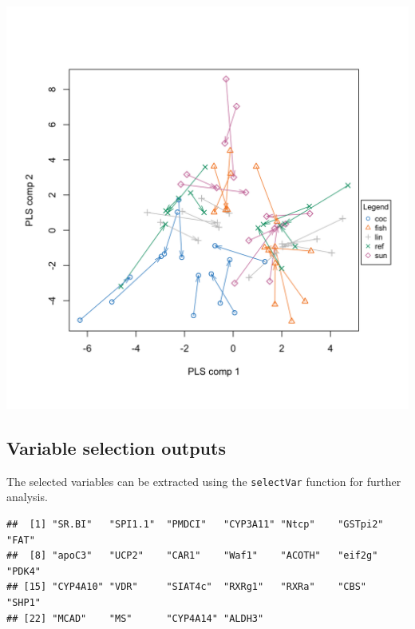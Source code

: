 \documentclass[]{book}
\newenvironment{Shaded}{\begin{snugshade}}{\end{snugshade}}
\newcommand{\CommentTok}[1]{\textcolor[rgb]{0.56,0.35,0.01}{\textit{#1}}}
\newcommand{\DataTypeTok}[1]{\textcolor[rgb]{0.13,0.29,0.53}{#1}}
\newcommand{\DecValTok}[1]{\textcolor[rgb]{0.00,0.00,0.81}{#1}}
\newcommand{\KeywordTok}[1]{\textcolor[rgb]{0.13,0.29,0.53}{\textbf{#1}}}
\newcommand{\NormalTok}[1]{#1}
\newcommand{\OperatorTok}[1]{\textcolor[rgb]{0.81,0.36,0.00}{\textbf{#1}}}
\newcommand{\StringTok}[1]{\textcolor[rgb]{0.31,0.60,0.02}{#1}}
\begin{document}
\begin{center}\includegraphics[width=0.75\linewidth,]{Figures/05-pls-plotArrow-1} \end{center}

\hypertarget{variable-selection-outputs-1}{%
\subsection{Variable selection outputs}\label{variable-selection-outputs-1}}

The selected variables can be extracted using the \texttt{selectVar} function for further analysis.

\begin{Shaded}
\end{Shaded}

\begin{verbatim}
##  [1] "SR.BI"   "SPI1.1"  "PMDCI"   "CYP3A11" "Ntcp"    "GSTpi2"  "FAT"    
##  [8] "apoC3"   "UCP2"    "CAR1"    "Waf1"    "ACOTH"   "eif2g"   "PDK4"   
## [15] "CYP4A10" "VDR"     "SIAT4c"  "RXRg1"   "RXRa"    "CBS"     "SHP1"   
## [22] "MCAD"    "MS"      "CYP4A14" "ALDH3"
\end{verbatim}

\begin{Shaded}
\end{Shaded}
\end{document}

